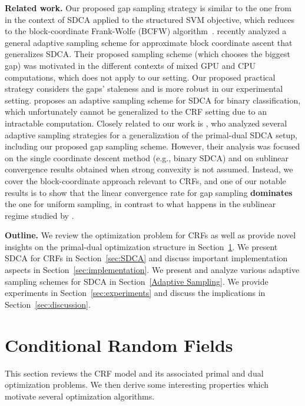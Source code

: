 \textbf{Related work.}
Our proposed gap sampling strategy is similar to the one from~\citet{osokin2016minding} in the context of SDCA applied to the structured SVM objective, which reduces to the block-coordinate Frank-Wolfe (BCFW) algorithm~\citep{lacoste2013block}.
\citet{dunner2017efficient} recently analyzed a general adaptive sampling scheme for approximate block coordinate ascent that generalizes SDCA.
Their proposed sampling scheme (which chooses the biggest gap) was motivated in the different contexts of mixed GPU and CPU computations, which does not apply to our setting.
Our proposed practical strategy considers the gaps' staleness and is more robust in our experimental setting.
\citet{csiba2015stochastic} proposes an adaptive sampling scheme for SDCA for binary classification, which unfortunately cannot be generalized to the CRF setting due to an intractable computation. Closely related to our work is \citet{perekrestenko17a}, who analyzed several adaptive sampling strategies for a generalization of the primal-dual SDCA setup, including our proposed gap sampling scheme. However, their analysis was focused on the single coordinate descent method (e.g., binary SDCA) and on sublinear convergence results obtained when strong convexity is not assumed. Instead, we cover the block-coordinate approach relevant to CRFs, and one of our notable results is to show that the linear convergence rate for gap sampling \textbf{dominates} the one for uniform sampling, in contrast to what happens in the sublinear regime studied by \citet{perekrestenko17a}.

\textbf{Outline.}
We review the optimization problem for CRFs as well as provide novel insights on the primal-dual optimization structure in Section~\ref{sec:CRF}.
We present SDCA for CRFs in Section~\ref{sec:SDCA} and discuss important implementation aspects in Section~\ref{sec:implementation}.
We present and analyze various adaptive sampling schemes for SDCA in Section~\ref{Adaptive Sampling}.
We provide experiments in Section~\ref{sec:experiments} and discuss the implications in Section~\ref{sec:discussion}.


\section{Conditional Random Fields} \label{sec:CRF}
This section reviews the CRF model and its associated primal and dual optimization problems.
We then derive some interesting properties which motivate several optimization algorithms.


